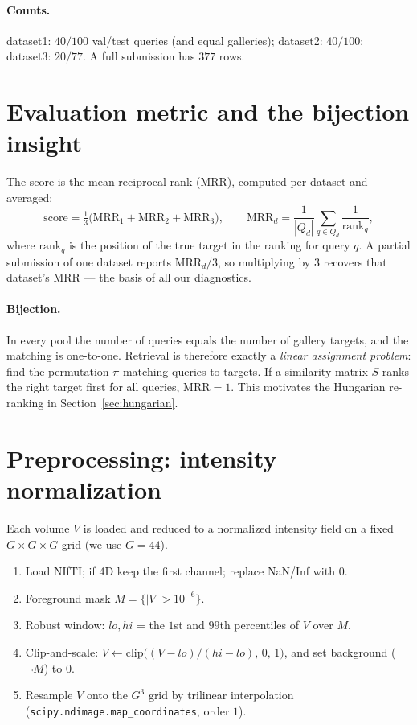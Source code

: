 \documentclass[11pt]{article}
\newcommand{\code}[1]{\texttt{#1}}
\begin{document}
\paragraph{Counts.} dataset1: $40/100$ val/test queries (and equal galleries);
dataset2: $40/100$; dataset3: $20/77$. A full submission has $377$ rows.

\section{Evaluation metric and the bijection insight}

The score is the mean reciprocal rank (MRR), computed per dataset and averaged:
\begin{equation}
\text{score} = \tfrac{1}{3}\big(\text{MRR}_{1}+\text{MRR}_{2}+\text{MRR}_{3}\big),
\qquad
\text{MRR}_d = \frac{1}{|Q_d|}\sum_{q\in Q_d}\frac{1}{\text{rank}_q},
\end{equation}
where $\text{rank}_q$ is the position of the true target in the ranking for query
$q$. A partial submission of one dataset reports $\text{MRR}_d/3$, so multiplying by
$3$ recovers that dataset's MRR --- the basis of all our diagnostics.

\paragraph{Bijection.} In every pool the number of queries equals the number of
gallery targets, and the matching is one-to-one. Retrieval is therefore exactly a
\emph{linear assignment problem}: find the permutation $\pi$ matching queries to
targets. If a similarity matrix $S$ ranks the right target first for all queries,
$\text{MRR}=1$. This motivates the Hungarian re-ranking in
Section~\ref{sec:hungarian}.

\section{Preprocessing: intensity normalization}\label{sec:prep}

Each volume $V$ is loaded and reduced to a normalized intensity field on a fixed
$G\times G\times G$ grid (we use $G=44$).

\begin{enumerate}[nosep]
  \item Load NIfTI; if 4D keep the first channel; replace NaN/Inf with $0$.
  \item Foreground mask $M=\{|V|>10^{-6}\}$.
  \item Robust window: $lo,hi$ = the $1$st and $99$th percentiles of $V$ over $M$.
  \item Clip-and-scale: $V \leftarrow \mathrm{clip}\!\big((V-lo)/(hi-lo),\,0,\,1\big)$,
        and set background ($\lnot M$) to $0$.
  \item Resample $V$ onto the $G^3$ grid by trilinear interpolation
        (\code{scipy.ndimage.map\_coordinates}, order $1$).
\end{enumerate}
\end{document}
